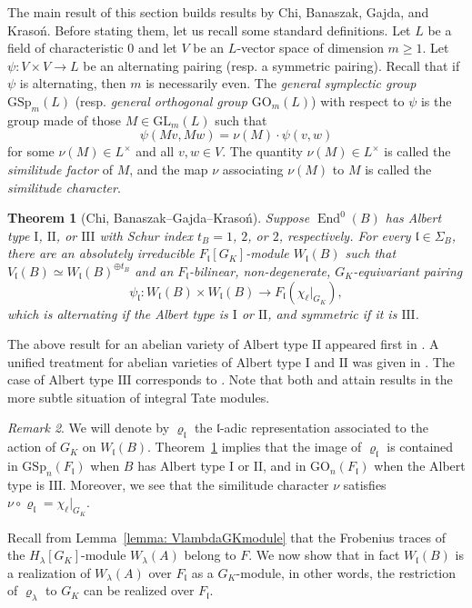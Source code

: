 \documentclass[oneside]{amsart}
\newtheorem{theorem}{Theorem}[section]
\theoremstyle{remark}
\newtheorem{remark}[theorem]{Remark}
\newcommand{\GL}{\mathrm{GL}}
\newcommand{\GSp}{\mathrm{GSp}}
\newcommand{\GO}{\mathrm{GO}}
\newcommand{\End}{\operatorname{End}}
\newcommand{\I}{\mathrm{I}}
\newcommand{\II}{\mathrm{II}}
\newcommand{\III}{\mathrm{III}}
\newcommand{\gl}{\mathfrak{l}}
\numberwithin{equation}{section}
\begin{document}
The main result of this section builds results by Chi, Banaszak, Gajda, and Krasoń. Before stating them, let us recall some standard definitions.
Let $L$ be a field of characteristic 0 and let $V$ be an $L$-vector space of dimension $m\geq 1$. Let $\psi:V\times V\to L$ be an alternating pairing (resp. a symmetric pairing). Recall that if $\psi$ is alternating, then $m$ is necessarily even. The \emph{general symplectic group $\GSp_{m}(L)$} (resp. \emph{general orthogonal group $\GO_{m}(L)$}) with respect to $\psi$ is the group made of those $M\in \GL_{m}(L)$ such that
\[
	\psi(Mv,Mw)=\nu(M)\cdot \psi(v,w)
\]
for some $\nu(M)\in L^\times$ and all $v,w\in V$. 
The quantity $\nu(M)\in L^\times$ is called the \emph{similitude factor} of $M$, and the map $\nu$ associating $\nu(M)$ to $M$ is called the \emph{similitude character}. 


\begin{theorem}[Chi, Banaszak--Gajda--Krasoń]\label{theorem:C-BGK types I II}
	Suppose $\End^0(B)$ has Albert type $\I$, $\II$, or $\III$ with Schur index $t_B=1$, $2$, or $2$, respectively. For every $\gl\in \Sigma_B$, there are an absolutely irreducible $F_\gl[G_K]$-module $W_\gl(B)$ such that $V_\gl(B) \simeq W_\gl(B)^{\oplus t_B}$ and an $F_\gl$-bilinear, non-degenerate, $G_K$-equivariant pairing
	\[
		\psi_\gl:W_\gl(B)\times W_\gl(B) \to F_\gl(\chi_\ell|_{G_K}),
	\]
 which is alternating if the Albert type is $\I$ or $\II$, and symmetric if it is $\III$.	
\end{theorem}


The above result for an abelian variety of Albert type $\II$ appeared first in \cite[Theorem~A]{Chi90}. A unified treatment for abelian varieties of Albert type $\I$ and $\II$ was given in \cite[\S4 and \S5]{BGK06}. The case of Albert type $\III$ corresponds to \cite[Theorem~3.23]{BGK10}. Note that both \cite{BGK06} and \cite{BGK10} attain results in the more subtle situation of integral Tate modules.

\begin{remark}
We will denote by $\varrho_\gl$ the $\gl$-adic representation associated to the action of $G_K$ on $W_\gl(B)$. Theorem~\ref{theorem:C-BGK types I II} implies that the image of $\varrho_\gl$ is contained in $\GSp_n(F_\gl)$ when $B$ has Albert type $\I$ or $\II$, and in $\GO_n(F_\gl)$ when the Albert type is $\III$. Moreover, we see that the similitude character $\nu$ satisfies $\nu\circ \varrho_\gl=\chi_\ell|_{G_K}$.
\end{remark}


Recall from Lemma~\ref{lemma: VlambdaGKmodule} that the Frobenius traces of the $H_\lambda[G_K]$-module $W_\lambda(A)$ belong to $F$. We now show that in fact $W_\gl(B)$ is a realization of $W_\lambda(A)$ over $F_\gl$ as a $G_K$-module, in other words, the restriction of $\varrho_\lambda$ to $G_K$ can be realized over $F_\gl$.
\end{document}
